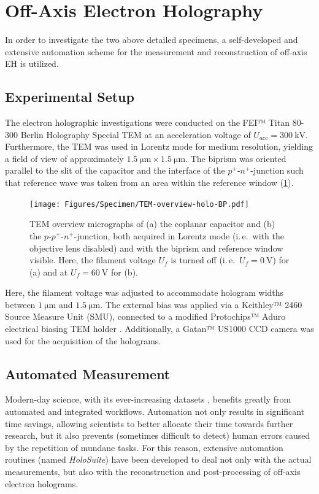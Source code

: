 \section{Off-Axis Electron Holography}
In order to investigate the two above detailed specimens, a self-developed and extensive automation scheme for the measurement and reconstruction of off-axis EH is utilized.
\subsection{Experimental Setup} \label{ssec:off-axis-EH-experimental-setup}
The electron holographic investigations were conducted on the FEI™ Titan 80-300 Berlin Holography Special TEM at an acceleration voltage of $U_{\mathit{acc}} = \SI{300}{\kilo\volt}$. Furthermore, the TEM was used in Lorentz mode for medium resolution, yielding a field of view of approximately $\SI{1.5}{\um} \times \SI{1.5}{\um}$. The biprism was oriented parallel to the slit of the capacitor and the interface of the $p^+$-$n^+$-junction such that reference wave was taken from an area within the reference window (\cref{fig:TEM-overview-holo-BP}).
\begin{figure}[H]
	\centering
	\texttt{[image: Figures/Specimen/TEM-overview-holo-BP.pdf]}
	\caption{TEM overview micrographs of (a) the coplanar capacitor and (b) the $p$-$p^+$-$n^+$-junction, both acquired in Lorentz mode (i.\,e.\ with the objective lens disabled) and with the biprism and reference window visible. Here, the filament voltage $U_f$ is turned off (i.\,e.\ $U_f = \SI{0}{\volt}$) for (a) and at $U_f = \SI{60}{\volt}$ for (b).}
	\label{fig:TEM-overview-holo-BP}
\end{figure}
Here, the filament voltage was adjusted to accommodate hologram widths between $\SI{1}{\um}$ and $\SI{1.5}{\um}$. The external bias was applied via a Keithley™ 2460 Source Measure Unit (SMU), connected to a modified Protochips™ Aduro electrical biasing TEM holder \cite{Wagner2022}. Additionally, a Gatan™ US1000 CCD camera was used for the acquisition of the holograms.
\subsection{Automated Measurement} \label{ssec:holosuite-automated-measurement}
Modern-day science, with its ever-increasing datasets \cite{Tate2016,Baldwin2018,Ophus2019,Spurgeon2021}, benefits greatly from automated and integrated workflows. Automation not only results in significant time savings, allowing scientists to better allocate their time towards further research, but it also prevents (sometimes difficult to detect) human errors caused by the repetition of mundane tasks. For this reason, extensive automation routines (named \emph{HoloSuite}) have been developed to deal not only with the actual measurements, but also with the reconstruction and post-processing of off-axis electron holograms.

